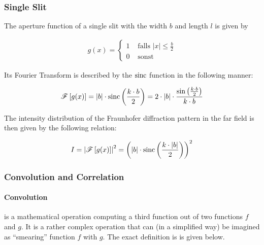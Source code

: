 \subsubsection{Single Slit}

The aperture function of a single slit with the width $b$ and length $l$ is given by

\begin{align}
g(x)=\begin{cases}1 &\mbox{ falls }|x|\leq\frac{b}{2}\\0 &\mbox{ sonst }\end{cases}
\end{align}

Its Fourier Transform is described by the $\mathrm{sinc}$ function in the following manner:

\begin{align}
\mathscr{F}\left[ g(x) \right] = \left| b\right| \cdot \mathrm{sinc}\left( \frac{k \cdot b}{2}\right)  = 2 \cdot \left| b\right| \cdot \frac{\sin\left( \frac{k \cdot b}{2}\right)}{k \cdot b}
\end{align}


The intensity distribution of the Fraunhofer diffraction pattern in the far field is then given by the following relation:

\begin{align}
I = \left| \mathscr{F}\left[ g(x) \right]\right| ^2 = \left( \left| b\right| \cdot \mathrm{sinc}\left( \frac{k \cdot \left| b\right| }{2} \right) \right) ^2
\end{align}




\subsubsection{Convolution and Correlation}

\paragraph{Convolution} is a mathematical operation computing a third function out of two functions $f$ and $g$. It is a rather complex operation that can (in a simplified way) be imagined as ``smearing'' function $f$ with $g$. The exact definition is is given below.

